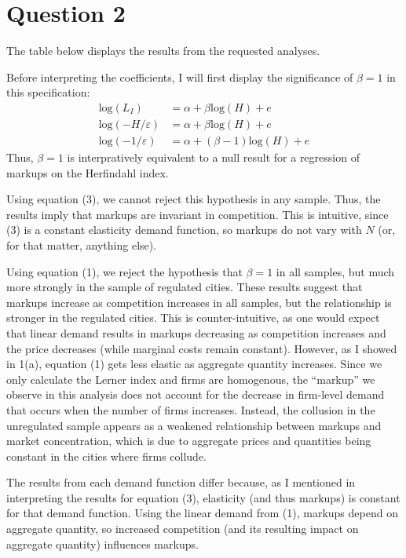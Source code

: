 \documentclass{article}
\newcommand{\loge}[1]{\text{log}\left(#1\right)}
\begin{document}
\pagebreak 
\section*{Question 2}
The table below displays the results from the requested analyses.
\begin{center}
  
\end{center}
Before interpreting the coefficients, I will first display the significance of ${\beta=1}$ in this specification:\begin{align*} 
  \loge{L_I} &= \alpha + \beta\loge{H} + e \\
  \loge{-H/\varepsilon} &= \alpha + \beta\loge{H} + e \\
  \loge{-1/\varepsilon} &= \alpha + (\beta-1)\loge{H} + e 
\end{align*}
Thus, ${\beta=1}$ is interpratively equivalent to a null result for a regression of markups on the Herfindahl index.

Using equation (3), we cannot reject this hypothesis in any sample. Thus, the results imply that markups are invariant in competition. This is intuitive, since (3) is a constant elasticity demand function, so markups do not vary with $N$ (or, for that matter, anything else).

Using equation (1), we reject the hypothesis that ${\beta=1}$ in all samples, but much more strongly in the sample of regulated cities. These results suggest that markups increase as competition increases in all samples, but the relationship is stronger in the regulated cities. This is counter-intuitive, as one would expect that linear demand results in markups decreasing as competition increases and the price decreases (while marginal costs remain constant). However, as I showed in 1(a), equation (1) gets less elastic as aggregate quantity increases. Since we only calculate the Lerner index and firms are homogenous, the ``markup'' we observe in this analysis does not account for the decrease in firm-level demand that occurs when the number of firms increases. Instead, the collusion in the unregulated sample appears as a weakened relationship between markups and market concentration, which is due to aggregate prices and quantities being constant in the cities where firms collude.

The results from each demand function differ because, as I mentioned in interpreting the results for equation (3), elasticity (and thus markups) is constant for that demand function. Using the linear demand from (1), markups depend on aggregate quantity, so increased competition (and its resulting impact on aggregate quantity) influences markups.
\end{document}
